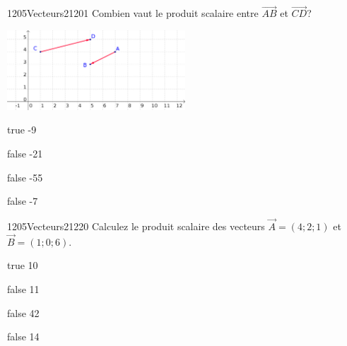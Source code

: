 \documentclass[11pt]{article}
\begin{document}
            \begin{question}{1205}{Vecteurs}{2}{1201}
                Combien vaut le produit scalaire entre $\vec{AB}$ et $\vec{CD}$?\\
                \begin{center}
                	\includegraphics[width=0.5\textwidth]{Philippe/Figures_Philippe/vecteurs_4_5.png}
                \end{center}
            \end{question}

            \begin{reponses}
                \item[true] -9
                \item[false] -21
                \item[false] -55
                \item[false] -7 
            \end{reponses}

            \begin{question}{1205}{Vecteurs}{2}{1220}
                Calculez le produit scalaire des vecteurs $\vec{A}=(4;2;1)$ et $\vec{B}=(1;0;6)$.
            \end{question}

            \begin{reponses}
                \item[true] 10
                \item[false] 11
                \item[false] 42
                \item[false] 14
            \end{reponses}
            
\end{document}
